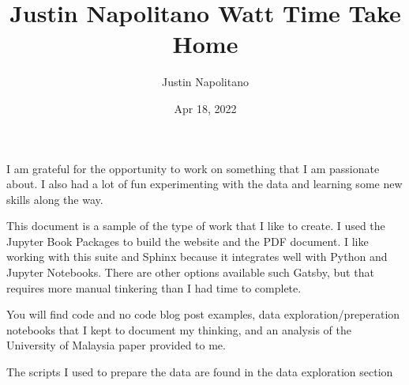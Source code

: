 \documentclass[letterpaper,10pt,english]{jupyterBook}
\title{Justin Napolitano Watt Time Take Home}
\date{Apr 18, 2022}
\author{Justin Napolitano}
\begin{document}
\pagestyle{empty}
\sphinxmaketitle
\pagestyle{plain}
\sphinxtableofcontents
\pagestyle{normal}
\label{\detokenize{index::doc}}


\begin{DUlineblock}{0em}
\item[] 
\end{DUlineblock}

\sphinxAtStartPar
I am grateful for the opportunity to work on something that I am passionate about.  I also had a lot of fun experimenting with the data and learning some new skills along the way.

\begin{DUlineblock}{0em}
\item[] 
\end{DUlineblock}

\sphinxAtStartPar
This document is a sample of the type of work that I like to create. I used the Jupyter Book Packages  to build the website and the PDF document.  I like working with this suite and Sphinx because it integrates well with Python and Jupyter Notebooks.  There are other options available such Gatsby, but that requires more manual tinkering than I had time to complete.

\begin{DUlineblock}{0em}
\item[] 
\end{DUlineblock}

\sphinxAtStartPar
You will find code and no code blog post examples, data exploration/preperation notebooks that I kept to document my thinking, and an analysis of the University of Malaysia paper provided to me.

\sphinxAtStartPar
The scripts I used to prepare the data are found in the data exploration section
\end{document}
